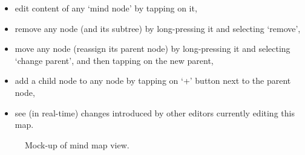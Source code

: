 \begin{itemize}
	\item edit content of any `mind node' by tapping on it,
	\item remove any node (and its subtree) by long-pressing it and selecting `remove',
	\item move any node (reassign its parent node) by long-pressing it and selecting `change parent', and then tapping on the new parent,
	\item add a child node to any node by tapping on `+' button next to the parent node,
	\item see (in real-time) changes introduced by other editors currently editing this map.
\end{itemize}

\begin{figure}[h]
	\centering
	\caption{Mock-up of mind map view.}
	\label{fig:mockup-mindmap}
\end{figure}

\todo[inline,caption=\michal{K., any more mock-ups needed?}]{}
